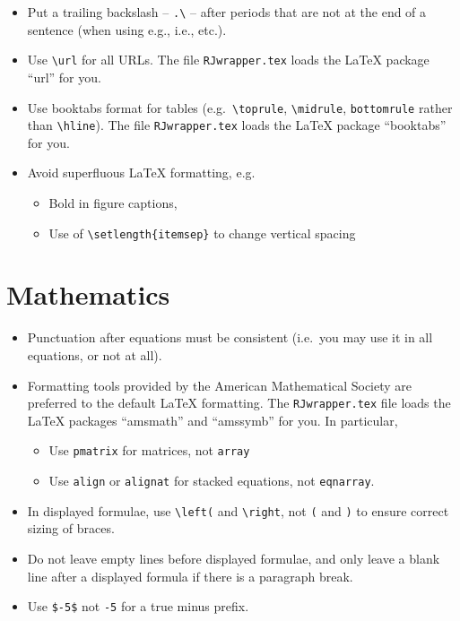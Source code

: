 \documentclass[11pt]{article}
\begin{document}
\begin{itemize}
\item Put a trailing backslash -- \verb+.\+ -- after periods that are not at 
  the end of a sentence (when using e.g., i.e., etc.).
\item Use \verb+\url+ for all URLs. The file \texttt{RJwrapper.tex} 
  loads the LaTeX package ``url'' for you.
\item Use booktabs format for tables (e.g.\ \verb+\toprule+, 
  \verb+\midrule+, \verb+bottomrule+ rather than \verb+\hline+).
  The file \texttt{RJwrapper.tex} loads the LaTeX package ``booktabs''
  for you.
\item Avoid superfluous LaTeX formatting, e.g.
  \begin{itemize}
  \item Bold in figure captions,
  \item Use of \verb+\setlength{itemsep}+ to change vertical spacing
  \end{itemize}
\end{itemize}

\section*{Mathematics}

\begin{itemize}
\item Punctuation after equations must be consistent (i.e.\ you may
  use it in all equations, or not at all).
\item Formatting tools provided by the American Mathematical Society
  are preferred to the default LaTeX formatting. The
  \texttt{RJwrapper.tex} file loads the LaTeX packages ``amsmath'' and
  ``amssymb'' for you. In particular,
  \begin{itemize}
  \item Use \verb+pmatrix+ for matrices, not \verb+array+
  \item Use \verb+align+ or \verb+alignat+ for stacked equations,
    not \verb+eqnarray+.
  \end{itemize}
\item In displayed formulae, use \verb+\left(+ and \verb+\right+, not
  \verb+(+ and \verb+)+ to ensure correct sizing of braces.
\item Do not leave empty lines before displayed formulae, and only
  leave a blank line after a displayed formula if there is a paragraph
  break.
\item Use \verb+$-5$+ not \verb+-5+ for a true minus prefix.
\end{itemize}
\end{document}
